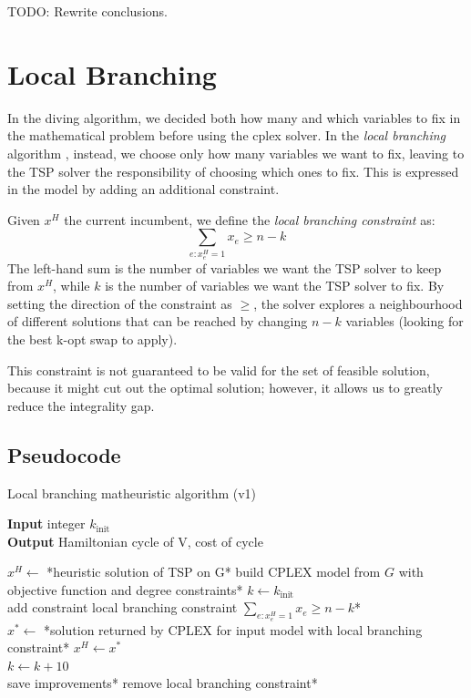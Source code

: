 TODO: Rewrite conclusions.

\section{Local Branching}

In the diving algorithm, we decided both how many and which variables to fix in the mathematical problem before using the cplex solver. In the \textit{local branching} algorithm \cite{Fischetti2003}, instead, we choose only how many variables we want to fix, leaving to the TSP solver the responsibility of choosing which ones to fix. This is expressed in the model by adding an additional constraint.

Given $x^H$ the current incumbent, we define the \textit{local branching constraint} as:
$$\sum_{e:x^H_e=1}x_e\geq n-k$$
The left-hand sum is the number of variables we want the TSP solver to keep from $x^H$, while $k$ is the number of variables we want the TSP solver to fix. By setting the direction of the constraint as $\geq$, the solver explores a neighbourhood of different solutions that can be reached by changing $n-k$ variables (looking for the best k-opt swap to apply).

This constraint is not guaranteed to be valid for the set of feasible solution, because it might cut out the optimal solution; however, it allows us to greatly reduce the integrality gap.

\FloatBarrier
\subsection{Pseudocode}
\begin{algorithm}[h]
    \caption{Local branching matheuristic algorithm (v1)}
    \textbf{Input} integer $k_{\text{init}}$\\
    \textbf{Output} Hamiltonian cycle of V, cost of cycle\\
    \begin{algorithmic}

        \State $x^H \gets$ *heuristic solution of TSP on G*
        \State *build CPLEX model from $G$ with objective function and degree constraints*
        \State $k\gets k_{\text{init}}$\\
        \State *add constraint local branching constraint $\sum_{e:x_e^H=1}x_e\geq n-k$*\\
        \State $x^*\gets$ *solution returned by CPLEX for input model with local branching constraint*
        \State $x^H\gets x^*$
        \EndIf\\
        \State $k\gets k+10$
        \EndIf\\
        \State *save improvements*
        \State *remove local branching constraint*
        \EndWhile

    \end{algorithmic}
\end{algorithm}
\FloatBarrier

